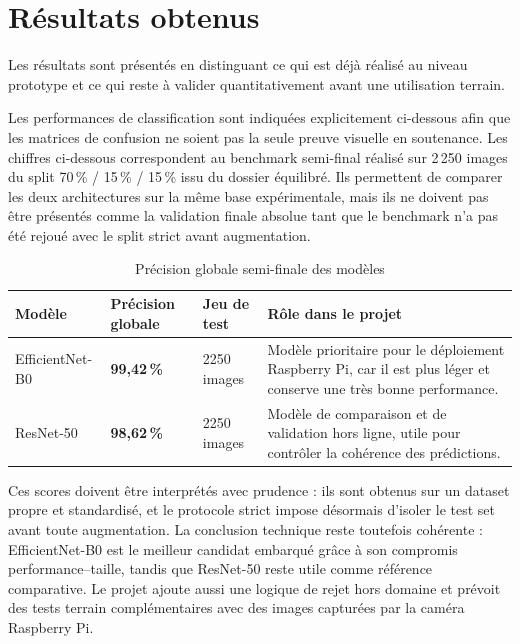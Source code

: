 ﻿\documentclass[11pt,a4paper,openany]{report}
\begin{document}
\section{Résultats obtenus}
Les résultats sont présentés en distinguant ce qui est déjà réalisé au niveau prototype et ce qui reste à valider quantitativement avant une utilisation terrain.

Les performances de classification sont indiquées explicitement ci-dessous afin que les matrices de confusion ne soient pas la seule preuve visuelle en soutenance. Les chiffres ci-dessous correspondent au benchmark semi-final réalisé sur 2\,250 images du split 70\,\% / 15\,\% / 15\,\% issu du dossier équilibré. Ils permettent de comparer les deux architectures sur la même base expérimentale, mais ils ne doivent pas être présentés comme la validation finale absolue tant que le benchmark n'a pas été rejoué avec le split strict avant augmentation.

\begin{table}[H]
\centering
\renewcommand{\arraystretch}{1.25}
\begin{tabular}{|p{3.6cm}|C{3cm}|C{2.4cm}|p{5.6cm}|}
\hline
\textbf{Modèle} & \textbf{Précision globale} & \textbf{Jeu de test} & \textbf{Rôle dans le projet} \\
\hline
EfficientNet-B0 & \textbf{99,42\,\%} & 2250 images & Modèle prioritaire pour le déploiement Raspberry Pi, car il est plus léger et conserve une très bonne performance. \\
\hline
ResNet-50 & \textbf{98,62\,\%} & 2250 images & Modèle de comparaison et de validation hors ligne, utile pour contrôler la cohérence des prédictions. \\
\hline
\end{tabular}
\caption{Précision globale semi-finale des modèles}
\label{tab:precision_globale_modeles}
\end{table}

Ces scores doivent être interprétés avec prudence : ils sont obtenus sur un dataset propre et standardisé, et le protocole strict impose désormais d'isoler le test set avant toute augmentation. La conclusion technique reste toutefois cohérente : EfficientNet-B0 est le meilleur candidat embarqué grâce à son compromis performance--taille, tandis que ResNet-50 reste utile comme référence comparative. Le projet ajoute aussi une logique de rejet hors domaine et prévoit des tests terrain complémentaires avec des images capturées par la caméra Raspberry Pi.
\end{document}
